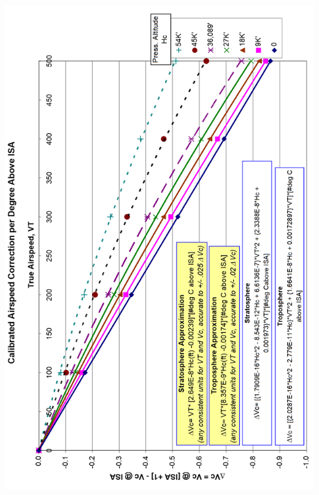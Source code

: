 \documentclass[
]{book}
\begin{document}
\includegraphics[width=5.74444in,height=9in]{media/04/image56.png}
\end{document}
